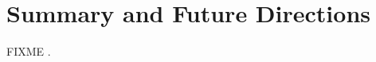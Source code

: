 
\chapter{Summary and Future Directions}

\begin{doublespace}
FIXME \cite{worley:abio2013}.
\end{doublespace}




